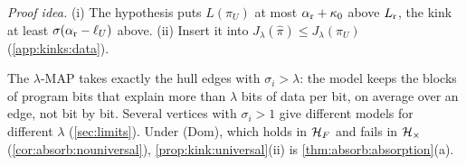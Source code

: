 \emph{Proof idea.} (i) The hypothesis puts $L(\pi_U)$ at most $\alpha_{\rm r}+\kappa_0$ above $L_{\rm r}$, the kink at least $\sigma(\alpha_{\rm r}-\ell_U)$ above. (ii) Insert it into $J_\lambda(\hat\pi)\le J_\lambda(\pi_U)$ (\cref{app:kinks:data}).

\begin{remark}[Reading]\label{rem:kink:reading}
The $\lambda$-MAP takes exactly the hull edges with $\sigma_i>\lambda$: the model keeps the blocks of program bits that explain more than $\lambda$ bits of data per bit, on average over an edge, not bit by bit. Several vertices with $\sigma_i>1$ give different models for different $\lambda$ (\cref{sec:limits}). Under (Dom), which holds in $\mathcal{H}_{F}$ and fails in $\mathcal{H}_{\times}$ (\cref{cor:absorb:nouniversal}), \cref{prop:kink:universal}(ii) is \cref{thm:absorb:absorption}(a).
\end{remark}

